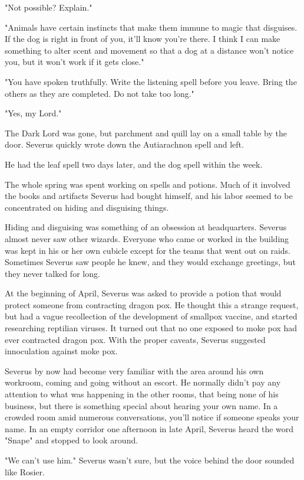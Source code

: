 "Not possible? Explain."

"Animals have certain instincts that make them immune to magic that disguises. If the dog is right in front of you, it'll know you're there. I think I can make something to alter scent and movement so that a dog at a distance won't notice you, but it won't work if it gets close."

"You have spoken truthfully. Write the listening spell before you leave. Bring the others as they are completed. Do not take too long."

"Yes, my Lord."

The Dark Lord was gone, but parchment and quill lay on a small table by the door. Severus quickly wrote down the Autiarachnon spell and left.

He had the leaf spell two days later, and the dog spell within the week.

The whole spring was spent working on spells and potions. Much of it involved the books and artifacts Severus had bought himself, and his labor seemed to be concentrated on hiding and disguising things.

Hiding and disguising was something of an obsession at headquarters. Severus almost never saw other wizards. Everyone who came or worked in the building was kept in his or her own cubicle except for the teams that went out on raids. Sometimes Severus saw people he knew, and they would exchange greetings, but they never talked for long.

At the beginning of April, Severus was asked to provide a potion that would protect someone from contracting dragon pox. He thought this a strange request, but had a vague recollection of the development of smallpox vaccine, and started researching reptilian viruses. It turned out that no one exposed to moke pox had ever contracted dragon pox. With the proper caveats, Severus suggested innoculation against moke pox.

Severus by now had become very familiar with the area around his own workroom, coming and going without an escort. He normally didn't pay any attention to what was happening in the other rooms, that being none of his business, but there is something special about hearing your own name. In a crowded room amid numerous conversations, you'll notice if someone speaks your name. In an empty corridor one afternoon in late April, Severus heard the word "Snape" and stopped to look around.

"We can't use him." Severus wasn't sure, but the voice behind the door sounded like Rosier.

